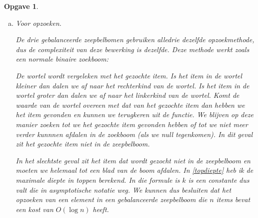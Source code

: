 \documentclass[12pt,hidelinks]{article}
\newtheorem{opgave}{Opgave}
\begin{document}
\begin{opgave}
\begin{enumerate}[a.]
            \item Voor opzoeken. \label{opzoeken}

                \normalfont
                De drie gebalanceerde zeepbelbomen gebruiken alledrie dezelfde opzoekmethode, dus de complexiteit van deze bewerking is dezelfde.
                Deze methode werkt zoals een normale binaire zoekboom: 

                De wortel wordt vergeleken met het gezochte item. Is het item in de wortel kleiner dan dalen we af naar het rechterkind van de wortel. 
                Is het item in de wortel groter dan dalen we af naar het linkerkind van de wortel.
                Komt de waarde van de wortel overeen met dat van het gezochte item dan hebben we het item gevonden en kunnen we terugkeren uit de functie.
                We blijven op deze manier zoeken tot we het gezochte item gevonden hebben of tot we niet meer verder kunnnen afdalen in de zoekboom (als we null tegenkomen).
                In dit geval zit het gezochte item niet in de zeepbelboom.

                In het slechtste geval zit het item dat wordt gezocht niet in de zeepbelboom en moeten we helemaal tot een blad van de boom afdalen.
                In \eqref{topdiepte} heb ik de maximale diepte in toppen berekend.
                In die formule is $k$ is een constante dus valt die in asymptotische notatie weg.
                We kunnen dus besluiten dat het opzoeken van een element in een gebalanceerde zeepbelboom die $n$ items bevat een kost van $O(\log n)$ heeft.
        \end{enumerate}
    \end{opgave}
\end{document}
